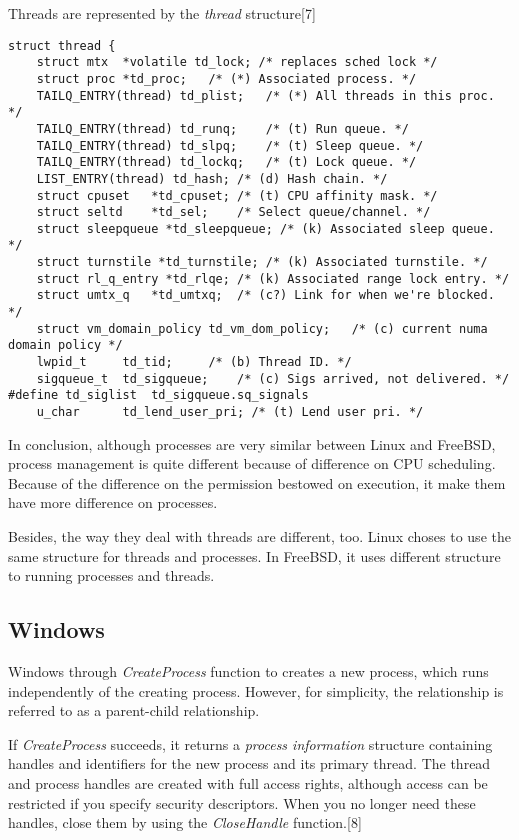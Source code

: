 \documentclass[onecolumn, draftclsnofoot,10pt, compsoc]{IEEEtran}
\begin{document}
Threads are represented by the \textit{thread} structure[7]

\begin{lstlisting}[caption={Excerpt from \textit{thread} structure}]
struct thread {
    struct mtx  *volatile td_lock; /* replaces sched lock */
    struct proc *td_proc;   /* (*) Associated process. */
    TAILQ_ENTRY(thread) td_plist;   /* (*) All threads in this proc. */
    TAILQ_ENTRY(thread) td_runq;    /* (t) Run queue. */
    TAILQ_ENTRY(thread) td_slpq;    /* (t) Sleep queue. */
    TAILQ_ENTRY(thread) td_lockq;   /* (t) Lock queue. */
    LIST_ENTRY(thread) td_hash; /* (d) Hash chain. */
    struct cpuset   *td_cpuset; /* (t) CPU affinity mask. */
    struct seltd    *td_sel;    /* Select queue/channel. */
    struct sleepqueue *td_sleepqueue; /* (k) Associated sleep queue. */
    struct turnstile *td_turnstile; /* (k) Associated turnstile. */
    struct rl_q_entry *td_rlqe; /* (k) Associated range lock entry. */
    struct umtx_q   *td_umtxq;  /* (c?) Link for when we're blocked. */
    struct vm_domain_policy td_vm_dom_policy;   /* (c) current numa domain policy */
    lwpid_t     td_tid;     /* (b) Thread ID. */
    sigqueue_t  td_sigqueue;    /* (c) Sigs arrived, not delivered. */
#define td_siglist  td_sigqueue.sq_signals
    u_char      td_lend_user_pri; /* (t) Lend user pri. */

\end{lstlisting}

In conclusion, although processes are very similar between Linux and FreeBSD, process management is quite different because of difference on CPU scheduling. Because of the difference on the permission bestowed on execution, it make them have more difference on processes.

Besides, the way they deal with threads are different, too. Linux choses to use the same structure for threads and processes. In FreeBSD, it uses different structure to running processes and threads.

\subsection{Windows}
Windows through \textit{CreateProcess} function to creates a new process, which runs independently of the creating process. However, for simplicity, the relationship is referred to as a parent-child relationship.

If \textit{CreateProcess} succeeds, it returns a \textit{process information} structure containing handles and identifiers for the new process and its primary thread. The thread and process handles are created with full access rights, although access can be restricted if you specify security descriptors. When you no longer need these handles, close them by using the \textit{CloseHandle} function.[8]
\end{document}
